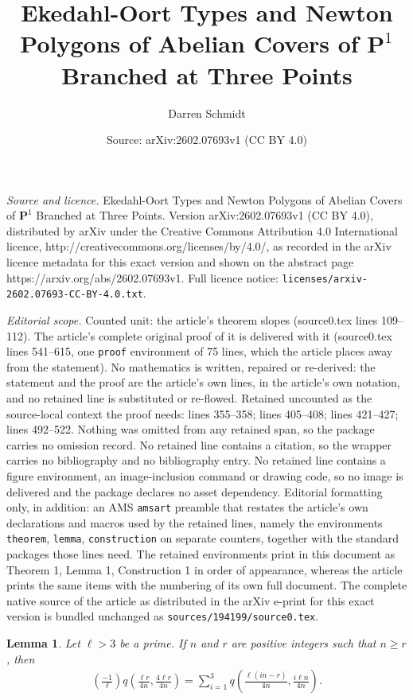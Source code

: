 \documentclass[10pt,a4paper]{amsart}
\title{Ekedahl-Oort Types and Newton Polygons of Abelian Covers of $\mathbf{P}^1$ Branched at Three Points}
\author{Darren Schmidt}
\date{Source: arXiv:2602.07693v1 (CC BY 4.0)}
\newtheorem{lemma}{Lemma}
\begin{document}
\maketitle

\noindent\emph{Source and licence.} Ekedahl-Oort Types and Newton Polygons of Abelian Covers of $\mathbf{P}^1$ Branched at Three Points. Version arXiv:2602.07693v1 (CC BY 4.0), distributed by arXiv under the Creative Commons Attribution 4.0 International licence, http://creativecommons.org/licenses/by/4.0/, as recorded in the arXiv licence metadata for this exact version and shown on the abstract page https://arxiv.org/abs/2602.07693v1. Full licence notice: \texttt{licenses/arxiv-2602.07693-CC-BY-4.0.txt}.\par\smallskip

\noindent\textit{Editorial scope.} Counted unit: the article's theorem slopes (source0.tex lines 109--112). The article's complete original proof of it is delivered with it (source0.tex lines 541--615, one \texttt{proof} environment of 75 lines, which the article places away from the statement). No mathematics is written, repaired or re-derived: the statement and the proof are the article's own lines, in the article's own notation, and no retained line is substituted or re-flowed.  Retained uncounted as the source-local context the proof needs: lines 355--358; lines 405--408; lines 421--427; lines 492--522.  Nothing was omitted from any retained span, so the package carries no omission record.  No retained line contains a citation, so the wrapper carries no bibliography and no bibliography entry.  No retained line contains a figure environment, an image-inclusion command or drawing code, so no image is delivered and the package declares no asset dependency.  Editorial formatting only, in addition: an AMS \texttt{amsart} preamble that restates the article's own declarations and macros used by the retained lines, namely the environments \texttt{theorem}, \texttt{lemma}, \texttt{construction} on separate counters, together with the standard packages those lines need.  The retained environments print in this document as Theorem 1, Lemma 1, Construction 1 in order of appearance, whereas the article prints the same items with the numbering of its own full document.  The complete native source of the article as distributed in the arXiv e-print for this exact version is bundled unchanged as \texttt{sources/194199/source0.tex}.
\begin{lemma}
\label{lemma}
    Let $\ell > 3$ be a prime. If $n$ and $r$ are positive integers such that $n \geq r$, then \begin{align}\left (\frac{-1}{\ell} \right ) q\left(\frac{\ell r}{4n}, \frac{4\ell r}{4n} \right) = \sum_{i=1}^3 q\left (\frac{\ell(in-r)}{4n}, \frac{i\ell n}{4n} \right) \label{lemma-align}. \end{align}
\end{lemma}
\end{document}
